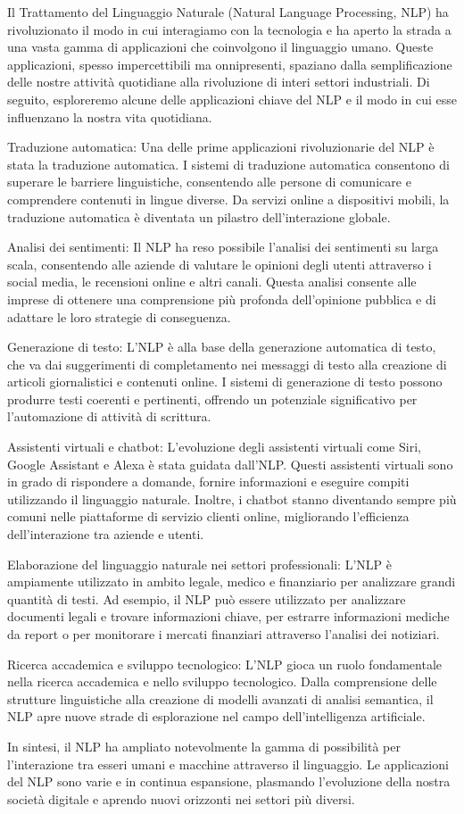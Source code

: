 Il Trattamento del Linguaggio Naturale (Natural Language Processing, NLP) ha rivoluzionato il modo in cui interagiamo con la tecnologia e ha aperto la strada a una vasta gamma di applicazioni che coinvolgono il linguaggio umano. Queste applicazioni, spesso impercettibili ma onnipresenti, spaziano dalla semplificazione delle nostre attività quotidiane alla rivoluzione di interi settori industriali. Di seguito, esploreremo alcune delle applicazioni chiave del NLP e il modo in cui esse influenzano la nostra vita quotidiana.

Traduzione automatica: Una delle prime applicazioni rivoluzionarie del NLP è stata la traduzione automatica. I sistemi di traduzione automatica consentono di superare le barriere linguistiche, consentendo alle persone di comunicare e comprendere contenuti in lingue diverse. Da servizi online a dispositivi mobili, la traduzione automatica è diventata un pilastro dell'interazione globale.

Analisi dei sentimenti: Il NLP ha reso possibile l'analisi dei sentimenti su larga scala, consentendo alle aziende di valutare le opinioni degli utenti attraverso i social media, le recensioni online e altri canali. Questa analisi consente alle imprese di ottenere una comprensione più profonda dell'opinione pubblica e di adattare le loro strategie di conseguenza.

Generazione di testo: L'NLP è alla base della generazione automatica di testo, che va dai suggerimenti di completamento nei messaggi di testo alla creazione di articoli giornalistici e contenuti online. I sistemi di generazione di testo possono produrre testi coerenti e pertinenti, offrendo un potenziale significativo per l'automazione di attività di scrittura.

Assistenti virtuali e chatbot: L'evoluzione degli assistenti virtuali come Siri, Google Assistant e Alexa è stata guidata dall'NLP. Questi assistenti virtuali sono in grado di rispondere a domande, fornire informazioni e eseguire compiti utilizzando il linguaggio naturale. Inoltre, i chatbot stanno diventando sempre più comuni nelle piattaforme di servizio clienti online, migliorando l'efficienza dell'interazione tra aziende e utenti.

Elaborazione del linguaggio naturale nei settori professionali: L'NLP è ampiamente utilizzato in ambito legale, medico e finanziario per analizzare grandi quantità di testi. Ad esempio, il NLP può essere utilizzato per analizzare documenti legali e trovare informazioni chiave, per estrarre informazioni mediche da report o per monitorare i mercati finanziari attraverso l'analisi dei notiziari.

Ricerca accademica e sviluppo tecnologico: L'NLP gioca un ruolo fondamentale nella ricerca accademica e nello sviluppo tecnologico. Dalla comprensione delle strutture linguistiche alla creazione di modelli avanzati di analisi semantica, il NLP apre nuove strade di esplorazione nel campo dell'intelligenza artificiale.

In sintesi, il NLP ha ampliato notevolmente la gamma di possibilità per l'interazione tra esseri umani e macchine attraverso il linguaggio. Le applicazioni del NLP sono varie e in continua espansione, plasmando l'evoluzione della nostra società digitale e aprendo nuovi orizzonti nei settori più diversi.